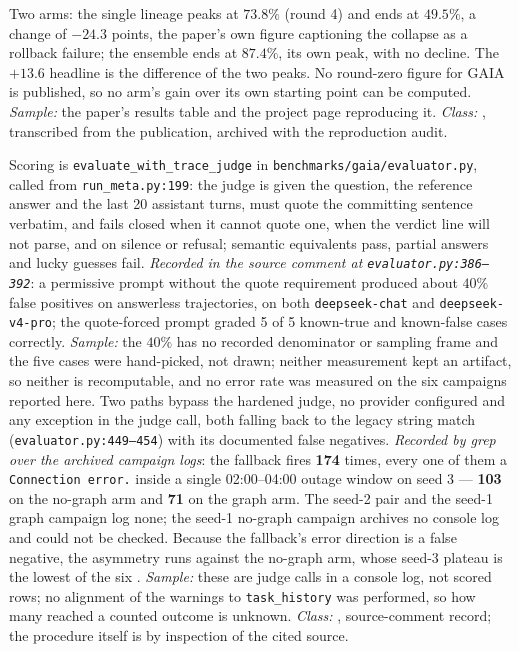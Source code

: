 \begin{description}[leftmargin=0pt,labelindent=0pt,labelsep=0pt,style=nextline,font=\normalfont,itemsep=6pt]
\item[\textbf{F68}\quad What the official paper reports on GAIA.]
Two arms: the single lineage peaks at $73.8\%$ (round 4) and ends at
$49.5\%$, a change of $-24.3$ points, the paper's own figure captioning the
collapse as a rollback failure; the ensemble ends at $87.4\%$, its own peak,
with no decline. The $+13.6$ headline is the difference of the two peaks.
No round-zero figure for GAIA is published, so no arm's gain over its own
starting point can be computed. \emph{Sample:} the paper's results table
and the project page reproducing it. \emph{Class:} , transcribed
from the publication, archived with the reproduction audit.

\item[\textbf{F69}\quad Judge validation record.]
Scoring is \texttt{evaluate\_\allowbreak with\_\allowbreak trace\_\allowbreak judge}
in \texttt{benchmarks/\allowbreak gaia/\allowbreak evaluator.py}, called from
\texttt{run\_meta.py:199}: the judge is given the question, the reference
answer and the last 20 assistant turns, must quote the committing sentence
verbatim, and fails closed when it cannot quote one, when the verdict line
will not parse, and on silence or refusal; semantic equivalents pass,
partial answers and lucky guesses fail.
\emph{Recorded in the source comment at \texttt{evaluator.py:386--392}}: a
permissive prompt without the quote requirement produced about $40\%$ false
positives on answerless trajectories, on both \texttt{deepseek-chat} and
\texttt{deepseek-v4-pro}; the quote-forced prompt graded 5 of 5 known-true
and known-false cases correctly. \emph{Sample:} the $40\%$ has no recorded
denominator or sampling frame and the five cases were hand-picked, not
drawn; neither measurement kept an artifact, so neither is recomputable,
and no error rate was measured on the six campaigns reported here. Two
paths bypass the hardened judge, no provider configured and any exception
in the judge call, both falling back to the legacy string match
(\texttt{evaluator.py:449--454}) with its documented false negatives. \emph{Recorded by grep over the archived campaign
logs}: the fallback fires \textbf{174} times, every one of them a
\texttt{Connection error.} inside a single 02:00--04:00 outage window on
seed 3 --- \textbf{103} on the no-graph arm and \textbf{71} on the graph
arm. The seed-2 pair and the seed-1 graph campaign log none; the seed-1
no-graph campaign archives no console log and could not be checked. Because
the fallback's error direction is a false negative, the asymmetry runs
against the no-graph arm, whose seed-3 plateau is the lowest of the six
. \emph{Sample:} these are judge calls in a console log, not scored
rows; no alignment of the warnings to \texttt{task\_history} was performed,
so how many reached a counted outcome is unknown.
\emph{Class:} , source-comment record; the procedure itself is
 by inspection of the cited source.



\end{description}
